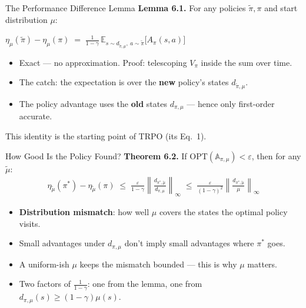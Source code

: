 \documentclass[aspectratio=169]{beamer}
\newcommand{\E}{\mathbb{E}}
\newcommand{\PA}{\mathbb{A}}              %
\begin{document}
\begin{frame}{The Performance Difference Lemma}
  \textbf{Lemma 6.1.} For any policies $\tilde\pi, \pi$ and start distribution $\mu$:
  \begin{formulabox}
    $\displaystyle \eta_\mu(\tilde\pi) - \eta_\mu(\pi) \;=\; \frac{1}{1-\gamma}\,\E_{s\sim d_{\tilde\pi,\mu},\ a\sim\tilde\pi}\big[A_\pi(s,a)\big]$
  \end{formulabox}
  \begin{itemize}
    \item Exact --- no approximation. Proof: telescoping $V_\pi$ inside the sum over time.
    \item The catch: the expectation is over the \textbf{new} policy's states $d_{\tilde\pi,\mu}$.
    \item The policy advantage uses the \textbf{old} states $d_{\pi,\mu}$ --- hence only first-order accurate.
  \end{itemize}
  \begin{noteframe}
    \small This identity is the starting point of TRPO (its Eq.~1).
  \end{noteframe}
\end{frame}

\begin{frame}{How Good Is the Policy Found?}
  \textbf{Theorem 6.2.} If $\mathrm{OPT}(\PA_{\pi,\mu}) < \varepsilon$, then for any $\tilde\mu$:
  \begin{gather*}
    \eta_{\tilde\mu}(\pi^*) - \eta_{\tilde\mu}(\pi)
    \;\le\; \frac{\varepsilon}{1-\gamma}\left\|\frac{d_{\pi^*,\tilde\mu}}{d_{\pi,\mu}}\right\|_\infty
    \;\le\; \frac{\varepsilon}{(1-\gamma)^2}\left\|\frac{d_{\pi^*,\tilde\mu}}{\mu}\right\|_\infty
  \end{gather*}
  \begin{itemize}
    \item \textbf{Distribution mismatch}: how well $\mu$ covers the states the optimal policy visits.
    \item Small advantages under $d_{\pi,\mu}$ don't imply small advantages where $\pi^*$ goes.
    \item A uniform-ish $\mu$ keeps the mismatch bounded --- this is why $\mu$ matters.
    \item Two factors of $\frac{1}{1-\gamma}$: one from the lemma, one from $d_{\pi,\mu}(s) \ge (1-\gamma)\mu(s)$.
  \end{itemize}
\end{frame}
\end{document}
